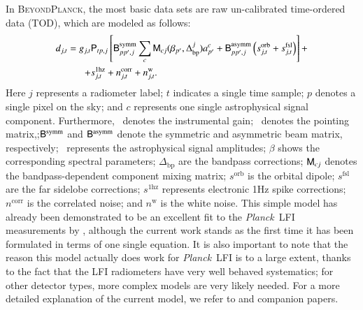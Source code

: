 \documentclass{aa}
\def\Planck{\textit{Planck}}
\def\,{\thinspace}
\renewcommand{\a}[0]{\vec{a}}
\newcommand{\B}[0]{\tens{B}}
\newcommand{\g}[0]{\vec{g}}
\newcommand{\M}[0]{\tens{M}}
\renewcommand{\P}[0]{\tens{P}}
\newcommand{\Dbp}[0]{\Delta_{\mathrm{bp}}}
\newcommand{\BP}{\textsc{BeyondPlanck}}
\begin{document}
In \BP,\, the most basic data sets are raw un-calibrated time-ordered
data (TOD), which are modeled as follows:
\begin{equation}
  \begin{split}
    d_{j,t} = g_{j,t}&\P_{tp,j}\left[\B^{\mathrm{symm}}_{pp',j}\sum_{c}
      \M_{cj}(\beta_{p'}, \Dbp^{j})a^c_{p'}  + \B^{\mathrm{asymm}}_{pp',j}\left(s^{\mathrm{orb}}_{j,t}  
      + s^{\mathrm{fsl}}_{j,t}\right)\right] + \\
    + &s^{\mathrm{1hz}}_{j,t} + n^{\mathrm{corr}}_{j,t} + n^{\mathrm{w}}_{j,t}.
  \end{split}
  \label{eq:todmodel}
\end{equation}
Here $j$ represents a radiometer label; $t$ indicates a single time
sample; $p$ denotes a single pixel on the sky; and $c$ represents one
single astrophysical signal component. Furthermore, \g\ denotes the
instrumental gain; \P\ denotes the pointing matrix,;$\B^{\mathrm{symm}}$ and $\B^{\mathrm{asymm}}$ denote the symmetric
and asymmetric beam matrix, respectively; \a\ represents the astrophysical
signal amplitudes; $\beta$ shows the corresponding spectral parameters;
$\Dbp$ are the bandpass corrections; $\M_{cj}$ denotes the
bandpass-dependent component mixing matrix; $s^{\mathrm{orb}}$ is the
orbital dipole; $s^{\mathrm{fsl}}$ are the far sidelobe corrections;
$s^{\mathrm{1hz}}$ represents electronic 1\,Hz spike corrections;
$n^{\mathrm{corr}}$ is the correlated noise; and $n^{\mathrm{w}}$ is
the white noise. This simple model has already been
  demonstrated to be an excellent fit to the \Planck\ LFI measurements
  by
  \citet{planck2013-p02,planck2014-a03,planck2014-a12,planck2016-l02},
  although the current work stands as the first time it has been
  formulated in terms of one single equation. It is also important to
  note that the reason this model actually does work for \Planck\ LFI
  is to a large extent, thanks to the fact that the LFI radiometers have
  very well behaved systematics; for other detector types, more
  complex models are very likely needed. For a more detailed
explanation of the current model, we refer to
\citet{bp01} and companion papers.
\end{document}
